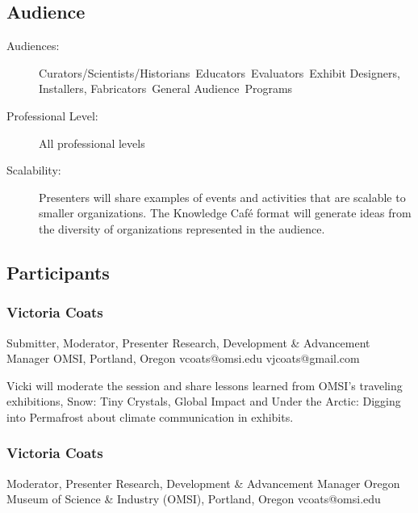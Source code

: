 \documentclass{report}
\begin{document}
              \subsection*{Audience}
                \begin{description}
                  \item [Audiences:]Curators/Scientists/Historians~Educators~Evaluators~Exhibit Designers, Installers, Fabricators~General Audience~Programs~
                  \item[Professional Level:]All professional levels~
                \item[Scalability:] Presenters will share examples of events and activities that are scalable to smaller organizations. The Knowledge Café format will generate ideas from the diversity of organizations represented in the audience.

							
              \end{description}
            \subsection*{Participants}
              \subsubsection*{ Victoria Coats }
              Submitter, Moderator, Presenter\newline
              Research, Development \& Advancement Manager\newline
              OMSI, Portland, Oregon
              \newline
              vcoats@omsi.edu\newline
              vjcoats@gmail.com\newline

              Vicki will moderate the session and share lessons learned from OMSI’s traveling exhibitions, Snow: Tiny Crystals, Global Impact and Under the Arctic: Digging into Permafrost about climate communication in exhibits.\newline


              
                \subsubsection*{ Victoria  Coats }
                Moderator, Presenter\newline
                Research, Development \& Advancement Manager\newline
                Oregon Museum of Science \& Industry (OMSI), Portland, Oregon
                \newline
                vcoats@omsi.edu\newline
                
\end{document}
